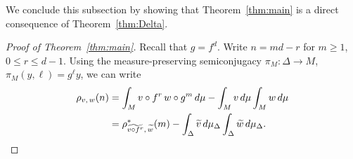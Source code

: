 \documentclass[AHL,Unicode,longabstracts,published]{cedram}
\newcommand{\tw}{\widetilde{w}}
\newcommand{\tv}{\tilde{v}}
\let\oldtilde\tilde
\renewcommand*{\tilde}[1]{\mathchoice{\widetilde{#1}}{\widetilde{#1}}{\oldtilde{#1}}{\oldtilde{#1}}}
\begin{document}
We conclude this subsection by showing that Theorem~\ref{thm:main} is a direct consequence of Theorem~\ref{thm:Delta}.

\begin{proof}[Proof of Theorem~\ref{thm:main}]
Recall that $g=f^d$. Write $n=md-r$ for $m\ge1$, $0\le r\le d-1$. Using the measure-preserving semiconjugacy $\pi_M:\Delta\to M$, $\pi_M(y,\ell)=g^\ell y$, we can write
\begin{equation}\label{eq:main}
\begin{aligned}
\rho_{v,\,w}(n) & =\int_M v\circ f^r\,w\circ g^m\,d\mu-\int_M v\,d\mu\int_M w\,d\mu\\
& =\rho^*_{\widetilde{v\circ f^r},\,\tw}(m)-\int_\Delta \tv\,d\mu_\Delta\int_\Delta \tw\,d\mu_\Delta.
\end{aligned}
\end{equation}


\end{proof}
\end{document}

